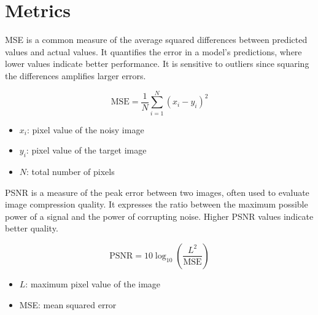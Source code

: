 \section{Metrics}

\Gls{MSE} is a common measure of the average squared differences between predicted values and actual values. It quantifies the error in a model’s predictions, where lower values indicate better performance. It is sensitive to outliers since squaring the differences amplifies larger errors.

\begin{note}
    {}
    \begin{equation}\label{eq:mse}
        \text{MSE} = \frac{1}{N} \sum_{i=1}^{N} (x_i - y_i)^2
    \end{equation}
    \begin{itemize}
        \item $x_i$: pixel value of the noisy image
        \item $y_i$: pixel value of the target image
        \item $N$: total number of pixels
    \end{itemize}
\end{note}

\Gls{PSNR} is a measure of the peak error between two images, often used to evaluate image compression quality. It expresses the ratio between the maximum possible power of a signal and the power of corrupting noise. Higher PSNR values indicate better quality.

\begin{note}
    {}
    \begin{equation}    
        \text{PSNR} = 10 \log_{10} \left( \frac{L^2}{\text{MSE}} \right)
    \end{equation}
    \begin{itemize}
        \item $L$: maximum pixel value of the image
        \item \gls{MSE}: mean squared error
    \end{itemize}
\end{note}


